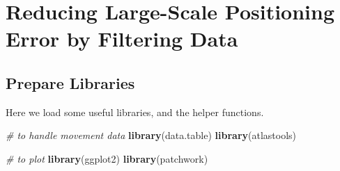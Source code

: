 \documentclass[
]{scrreprt}
\newenvironment{Shaded}{}{}
\newcommand{\CommentTok}[1]{\textcolor[rgb]{0.38,0.63,0.69}{\textit{#1}}}
\newcommand{\DataTypeTok}[1]{\textcolor[rgb]{0.56,0.13,0.00}{#1}}
\newcommand{\DecValTok}[1]{\textcolor[rgb]{0.25,0.63,0.44}{#1}}
\newcommand{\ErrorTok}[1]{\textcolor[rgb]{1.00,0.00,0.00}{\textbf{#1}}}
\newcommand{\FloatTok}[1]{\textcolor[rgb]{0.25,0.63,0.44}{#1}}
\newcommand{\KeywordTok}[1]{\textcolor[rgb]{0.00,0.44,0.13}{\textbf{#1}}}
\newcommand{\NormalTok}[1]{#1}
\newcommand{\OperatorTok}[1]{\textcolor[rgb]{0.40,0.40,0.40}{#1}}
\newcommand{\StringTok}[1]{\textcolor[rgb]{0.25,0.44,0.63}{#1}}
\begin{document}
\begin{Shaded}
\end{Shaded}

\hypertarget{reducing-large-scale-positioning-error-by-filtering-data}{%
\chapter{Reducing Large-Scale Positioning Error by Filtering Data}\label{reducing-large-scale-positioning-error-by-filtering-data}}

\hypertarget{prepare-libraries}{%
\section{Prepare Libraries}\label{prepare-libraries}}

Here we load some useful libraries, and the helper functions.

\begin{Shaded}
\begin{Highlighting}[]
\CommentTok{\# to handle movement data}
\KeywordTok{library}\NormalTok{(data.table)}
\KeywordTok{library}\NormalTok{(atlastools)}

\CommentTok{\# to plot}
\KeywordTok{library}\NormalTok{(ggplot2)}
\KeywordTok{library}\NormalTok{(patchwork)}
\end{Highlighting}
\end{Shaded}
\end{document}
